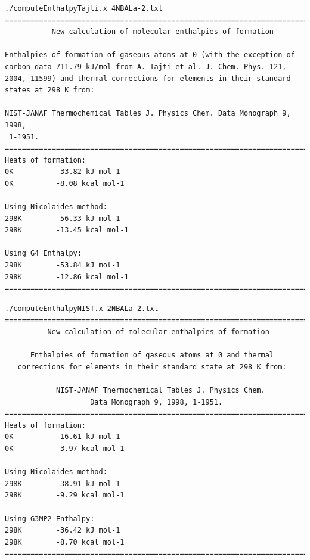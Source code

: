 \begin{lstlisting}[caption = Output de 4NBALa-2.txt en EnthalpyTajti]
./computeEnthalpyTajti.x 4NBALa-2.txt
========================================================================
           New calculation of molecular enthalpies of formation                         
                                                                                                   
Enthalpies of formation of gaseous atoms at 0 (with the exception of 
carbon data 711.79 kJ/mol from A. Tajti et al. J. Chem. Phys. 121, 
2004, 11599) and thermal corrections for elements in their standard 
states at 298 K from:                   
                                                                                                   
NIST-JANAF Thermochemical Tables J. Physics Chem. Data Monograph 9, 1998,
 1-1951.
========================================================================
Heats of formation: 
0K          -33.82 kJ mol-1
0K          -8.08 kcal mol-1
                                                                                                   
Using Nicolaides method: 
298K        -56.33 kJ mol-1
298K        -13.45 kcal mol-1
                                                                                                   
Using G4 Enthalpy: 
298K        -53.84 kJ mol-1
298K        -12.86 kcal mol-1
========================================================================
\end{lstlisting}


\newpage

\begin{lstlisting}[caption = Output de 2NBALa-2.txt en EnthalpyNIST]
./computeEnthalpyNIST.x 2NBALa-2.txt
========================================================================
          New calculation of molecular enthalpies of formation

      Enthalpies of formation of gaseous atoms at 0 and thermal 
   corrections for elements in their standard state at 298 K from:

            NIST-JANAF Thermochemical Tables J. Physics Chem. 
                    Data Monograph 9, 1998, 1-1951.
========================================================================
Heats of formation:
0K          -16.61 kJ mol-1
0K          -3.97 kcal mol-1

Using Nicolaides method:
298K        -38.91 kJ mol-1
298K        -9.29 kcal mol-1

Using G3MP2 Enthalpy:
298K        -36.42 kJ mol-1
298K        -8.70 kcal mol-1
========================================================================
\end{lstlisting}


